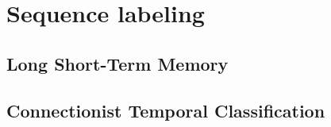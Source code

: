 \section{\label{sec:sequencelabeling}Sequence labeling}






\subsection{\label{sec:lstm}Long Short-Term Memory}

\subsection{\label{sec:ctc}Connectionist Temporal Classification}



